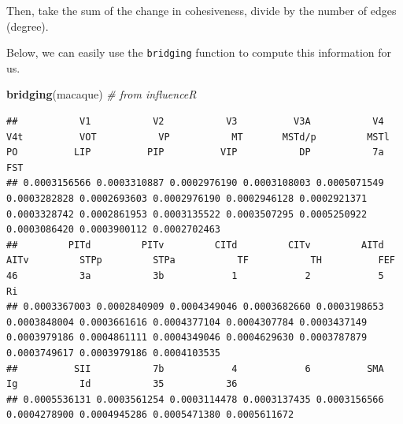 \documentclass[
]{book}
\newenvironment{Shaded}{\begin{snugshade}}{\end{snugshade}}
\newcommand{\AttributeTok}[1]{\textcolor[rgb]{0.13,0.29,0.53}{#1}}
\newcommand{\CommentTok}[1]{\textcolor[rgb]{0.56,0.35,0.01}{\textit{#1}}}
\newcommand{\FunctionTok}[1]{\textcolor[rgb]{0.13,0.29,0.53}{\textbf{#1}}}
\newcommand{\NormalTok}[1]{#1}
\newcommand{\OtherTok}[1]{\textcolor[rgb]{0.56,0.35,0.01}{#1}}
\newcommand{\SpecialCharTok}[1]{\textcolor[rgb]{0.81,0.36,0.00}{\textbf{#1}}}
\begin{document}
Then, take the sum of the change in cohesiveness, divide by the number of edges (degree).

Below, we can easily use the \texttt{bridging} function to compute this information for us.

\begin{Shaded}
\begin{Highlighting}[]
\FunctionTok{bridging}\NormalTok{(macaque) }\CommentTok{\# from influenceR}
\end{Highlighting}
\end{Shaded}

\begin{verbatim}
##           V1           V2           V3          V3A           V4          V4t          VOT           VP           MT       MSTd/p         MSTl           PO          LIP          PIP          VIP           DP           7a          FST 
## 0.0003156566 0.0003310887 0.0002976190 0.0003108003 0.0005071549 0.0003282828 0.0002693603 0.0002976190 0.0002946128 0.0002921371 0.0003328742 0.0002861953 0.0003135522 0.0003507295 0.0005250922 0.0003086420 0.0003900112 0.0002702463 
##         PITd         PITv         CITd         CITv         AITd         AITv         STPp         STPa           TF           TH          FEF           46           3a           3b            1            2            5           Ri 
## 0.0003367003 0.0002840909 0.0004349046 0.0003682660 0.0003198653 0.0003848004 0.0003661616 0.0004377104 0.0004307784 0.0003437149 0.0003979186 0.0004861111 0.0004349046 0.0004629630 0.0003787879 0.0003749617 0.0003979186 0.0004103535 
##          SII           7b            4            6          SMA           Ig           Id           35           36 
## 0.0005536131 0.0003561254 0.0003114478 0.0003137435 0.0003156566 0.0004278900 0.0004945286 0.0005471380 0.0005611672
\end{verbatim}

\begin{Shaded}
\end{Shaded}
\end{document}
